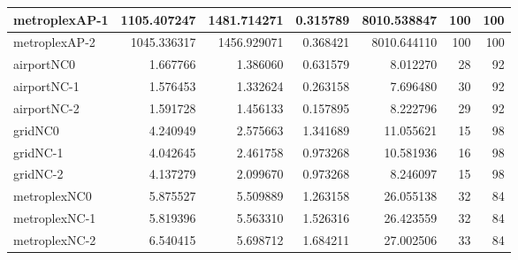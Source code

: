 \begin{longtable}{|l|r|r|r|r|r|r|}
metroplexAP-1 & 1105.407247 & 1481.714271 & 0.315789 & 8010.538847 & 100 & 100 \\ \hline
metroplexAP-2 & 1045.336317 & 1456.929071 & 0.368421 & 8010.644110 & 100 & 100 \\ \hline
airportNC0 & 1.667766 & 1.386060 & 0.631579 & 8.012270 & 28 & 92 \\ \hline
airportNC-1 & 1.576453 & 1.332624 & 0.263158 & 7.696480 & 30 & 92 \\ \hline
airportNC-2 & 1.591728 & 1.456133 & 0.157895 & 8.222796 & 29 & 92 \\ \hline
gridNC0 & 4.240949 & 2.575663 & 1.341689 & 11.055621 & 15 & 98 \\ \hline
gridNC-1 & 4.042645 & 2.461758 & 0.973268 & 10.581936 & 16 & 98 \\ \hline
gridNC-2 & 4.137279 & 2.099670 & 0.973268 & 8.246097 & 15 & 98 \\ \hline
metroplexNC0 & 5.875527 & 5.509889 & 1.263158 & 26.055138 & 32 & 84 \\ \hline
metroplexNC-1 & 5.819396 & 5.563310 & 1.526316 & 26.423559 & 32 & 84 \\ \hline
metroplexNC-2 & 6.540415 & 5.698712 & 1.684211 & 27.002506 & 33 & 84 \\ \hline
\end{longtable}
